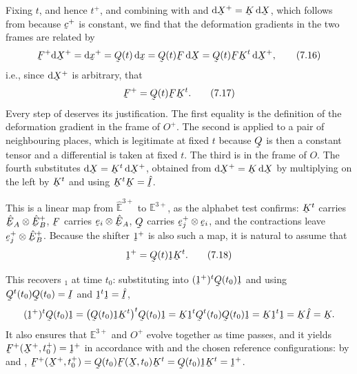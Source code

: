 Fixing $t$, and hence $t^{+}$, and combining  with 
and $\dl\bX^{+}=\bK\,\dl\bX$, which follows from  because
$\bc^{+}$ is constant, we find that the deformation gradients in the two
frames are related by
\begin{equation}
   \bF^{+}\dl\bX^{+}=\dl\bx^{+}=\bQ(t)\,\dl\bx=\bQ(t)\bF\,\dl\bX
   =\bQ(t)\bF\bK^{t}\,\dl\bX^{+},
   \tag{7.16}\label{eq:7.16}
\end{equation}
i.e., since $\dl\bX^{+}$ is arbitrary, that
\begin{equation}
   \bF^{+}=\bQ(t)\bF\bK^{t}.
   \tag{7.17}\label{eq:7.17}
\end{equation}
Every step of  deserves its justification. The first equality
is the definition  of the deformation gradient in the frame of
$O^{+}$. The second is  applied to a pair of neighbouring
places, which is legitimate at fixed $t$ because $\bQ$ is then a
constant tensor and a differential is taken at fixed $t$. The third is
 in the frame of $O$. The fourth substitutes
$\dl\bX=\bK^{t}\,\dl\bX^{+}$, obtained from $\dl\bX^{+}=\bK\,\dl\bX$ by
multiplying on the left by $\bK^{t}$ and using $\bK^{t}\bK=\hI$.

This is a linear map from $\hat{\mathbb{E}}^{3+}$ to $\mathbb{E}^{3+}$,
as the alphabet test confirms: $\bK^{t}$ carries
$\hbE_{A}\otimes\hbE^{+}_{B}$, $\bF$ carries $\be_{i}\otimes\hbE_{A}$,
$\bQ$ carries $\be^{+}_{j}\otimes\be_{i}$, and the contractions leave
$\be^{+}_{j}\otimes\hbE^{+}_{B}$. Because the shifter $\shift^{+}$ is
also such a map, it is natural to assume that
\begin{equation}
   \shift^{+}=\bQ(t)\shift\bK^{t}.
   \tag{7.18}\label{eq:7.18}
\end{equation}

This recovers $_{1}$ at time $t_{0}$: substituting 
into $(\shift^{+})^{t}\bQ(t_{0})\shift$ and using
$\bQ^{t}(t_{0})\bQ(t_{0})=\I$ and $\shift^{t}\shift=\hI$,
\[
   (\shift^{+})^{t}\bQ(t_{0})\shift
   =\big(\bQ(t_{0})\shift\bK^{t}\big)^{t}\bQ(t_{0})\shift
   =\bK\shift^{t}\bQ^{t}(t_{0})\bQ(t_{0})\shift
   =\bK\shift^{t}\shift=\bK\hI=\bK .
\]
It also ensures that $\mathbb{E}^{3+}$ and $O^{+}$ evolve together as
time passes, and it yields $\bF^{+}(\bX^{+},t^{+}_{0})=\shift^{+}$ in
accordance with  and the chosen reference configurations:
by  and ,
$\bF^{+}(\bX^{+},t^{+}_{0})=\bQ(t_{0})\bF(\bX,t_{0})\bK^{t}
=\bQ(t_{0})\shift\bK^{t}=\shift^{+}$.

